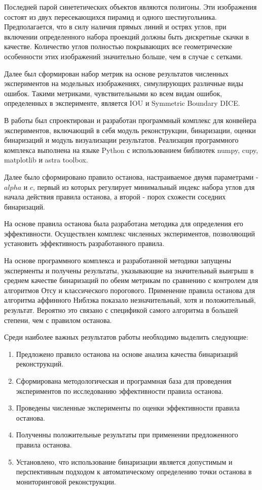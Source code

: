 Последней парой синететических объектов являются полигоны. Эти изображения состоят из двух пересекающихся пирамид и одного шестиугольника. Предполагается, что в силу наличия прямых линий и острвх углов, при включении определенного набора проекций должны быть дискретные скачки в качестве.
Количество углов полностью покрывающих все геометрические особенности этих изображений значительно больше, чем в случае с сетками.

Далее был сформирован набор метрик на основе результатов численных экспериментов на модельных изображениях, симулирующих различные виды ошибок. Такими метриками, чувствительными ко всем видам ошибок, определенных в эксперименте, является IOU и Symmetric Boundary DICE.

В работы был спроектирован и разработан программный комплекс для конвейера экспериментов, включающий в себя модуль реконструкции, бинаризации, оценки бинаризаций и модуль визуализации результатов. Реализация программного комплекса выполнена на языке Python с использованием библиотек numpy, cupy, matplotlib и astra toolbox.

Далее было сформировано правило останова, настраиваемое двумя параметрами - \(alpha\) и \(c\), первый из которых регулирует минимальный индекс набора углов для начала действия правила останова, а второй - порох схожести соседних бинаризаций.

На основе правила останова была разработана методика для определения его эффективности. Осуществлен комплекс численных экспериментов, позволяющий установить эффективность разработанного правила.

На основе программного комплекса и разработанной методики запущены эксперменты и получены результаты, указывающие на значительный выигрыш в среднем качестве бинаризаций по обеим метрикам по сравнению с контролем для алгоритмов Отсу и классического порогового. Применение правила останова для алгоритма аффинного Ниблэка показало незначительный, хотя и положительный, результат. Вероятно это связано с спецификой самого алгоритма в большей степени, чем с правилом останова.

Среди наиболее важных результатов работы необходимо выделить следующие:
\begin{enumerate}
    \item Предложено правило останова на основе анализа качества бинаризаций реконструкций.
    \item Сформирована методологическая и программная база для проведения экспериментов по исследованию эффективности правила останова.
    \item Проведены численные эксперименты по оценки эффективности правила останова.
    \item Полученны положительные результаты при применении предложенного правила останова.
    \item Установлено, что использование бинаризации является допустимым и перспективным подходом к автоматическому определению точки останова в мониторинговой реконструкции.
\end{enumerate}

